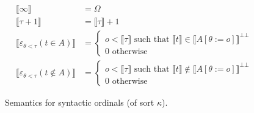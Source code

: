 \begin{figure}
  \begin{align*}
    \llbracket \infty \rrbracket &= \Omega\\
    \llbracket \tau+1 \rrbracket &= \llbracket \tau \rrbracket + 1\\
    \llbracket \varepsilon_{\theta<\tau}(t \in A) \rrbracket
      &= \begin{cases}
            o < \llbracket \tau \rrbracket \text{ such that }
              \llbracket t \rrbracket \in \llbracket A[\theta := o]
              \rrbracket^{\bot\bot}\\
            0 \text{ otherwise}
         \end{cases}\\
    \llbracket \varepsilon_{\theta<\tau}(t \notin A) \rrbracket
      &= \begin{cases}
            o < \llbracket \tau \rrbracket \text{ such that }
              \llbracket t \rrbracket \notin \llbracket A[\theta := o]
              \rrbracket^{\bot\bot}\\
            0 \text{ otherwise}
         \end{cases}
  \end{align*}
  \caption{Semantics for syntactic ordinals (of sort $\kappa$).}
  \label{semkappa}
\end{figure}


